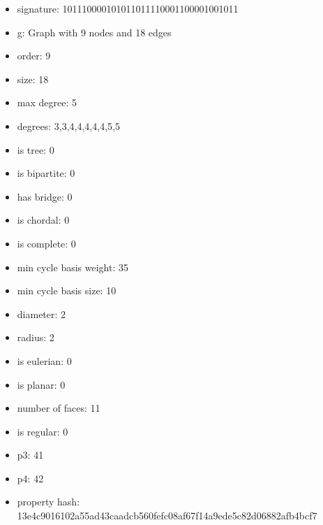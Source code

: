 \newpage
\begin{figure}
\end{figure}
\begin{itemize}
\item signature: 101110000101011011110001100001001011
\item g: Graph with 9 nodes and 18 edges
\item order: 9
\item size: 18
\item max degree: 5
\item degrees: 3,3,4,4,4,4,4,5,5
\item is tree: 0
\item is bipartite: 0
\item has bridge: 0
\item is chordal: 0
\item is complete: 0
\item min cycle basis weight: 35
\item min cycle basis size: 10
\item diameter: 2
\item radius: 2
\item is eulerian: 0
\item is planar: 0
\item number of faces: 11
\item is regular: 0
\item p3: 41
\item p4: 42
\item property hash: 13e4c9016102a55ad43caadcb560fefc08af67f14a9ede5c82d06882afb4bcf7
\end{itemize}

